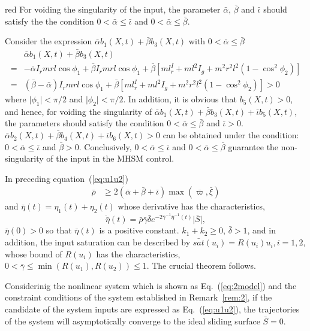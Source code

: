 \begin{color}{red}
For voiding the singularity of the input, the parameter $\bar\alpha$, $\bar\beta$ and $\bar\iota$ should satisfy the the condition $0<\bar\alpha\le\bar\iota$ and $0<\bar\alpha\le\bar\beta$.\par
    Consider the expression $\bar\alpha b_1(X,t) + \bar\beta b_3(X,t)$ with $0<\bar\alpha\le \bar\beta$
    \begin{align*}
    &\bar\alpha b_1(X,t) + \bar\beta b_3(X,t)\\
    =&-\bar\alpha I_rmrl\cos\phi_1 + \bar\beta I_rmrl\cos\phi_1+\bar\beta[ml^I_r+ml^2I_g+m^2r^2l^2(1-\cos^2\phi_2)]\\
    =&(\bar\beta-\bar\alpha) I_rmrl\cos\phi_1+\bar\beta[ml^I_r+ml^2I_g+m^2r^2l^2(1-\cos^2\phi_2)]>0
    \end{align*}
    where $\vert\phi_1\vert<\pi/2$ and $\vert\phi_2\vert<\pi/2$.
    In addition, it is obvious that $b_5(X,t)>0$, and hence, for voiding the singularity of $\bar\alpha b_1(X,t) + \bar\beta b_3(X,t) + \bar\iota b_5(X,t)$,  the parameters should satisfy the condition $0<\bar\alpha\le\bar\beta$ and $\bar\iota>0$. $\bar\alpha b_2(X,t) + \bar\beta b_4(X,t) + \bar\iota b_6(X,t)>0$ can be obtained under the condition: $0<\bar\alpha\le\bar\iota$ and $\bar\beta>0$. Conclusively, $0<\bar\alpha\le\bar\iota$ and $0<\bar\alpha\le\bar\beta$ guarantee the non-singularity of the input in the MHSM control.
\end{color}
In preceding equation~(\ref{eq:u1u2})
\begin{align}
\bar\rho &\ge 2(\bar\alpha + \bar\beta + \bar\iota)\max(\bar\varpi,\bar\xi)
\end{align}
and $\bar\eta(t)=\eta_1(t)+\eta_2(t)$ whose derivative has the characteristics, $$\dot{{\bar\eta}}(t) = \bar\rho\bar\gamma\bar\delta e^{-2\bar\gamma^{-1}{\bar\eta}^{-1}(t)}\vert \bar S\vert,$$ $\bar\eta(0) > 0$ so that $\bar\eta(t)$ is a positive constant. $k_1+k_2\ge 0$, $\bar\delta >1$, and in addition, the input saturation can be described by $\bar{sat}(u_i) = R(u_i)u_i, i =1,2$, whose bound of $R(u_i)$ has the characteristics, $0<\bar\gamma\le \min(R(u_1),R(u_2))\le 1$. The crucial theorem follows.
\begin{theorem}
Considerinig the nonlinear system which is shown as Eq.~(\ref{eq:2model}) and the constraint conditions of the system established in Remark~\ref{rem:2}, if the candidate of the system inputs are expressed as Eq.~(\ref{eq:u1u2}), the trajectories of the system will asymptotically converge to the ideal sliding surface $\bar S=0$.\label{theorem:3}
\end{theorem}
